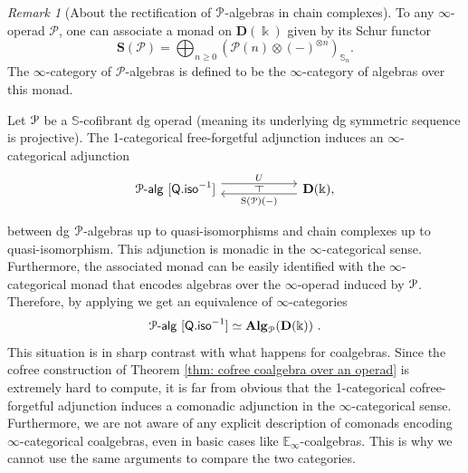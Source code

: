\documentclass{proc-l}
\renewcommand{\mathcal}{\EuScript}
\newcommand{\onepalg}{\mathcal{P}\text{-}\mathsf{alg}}
\theoremstyle{plain}
\theoremstyle{definition}
\theoremstyle{remark}
\newtheorem{remark}[{theorem}]{Remark}
\newcommand{\kk}{\Bbbk}
\begin{document}
\begin{remark}[{About the rectification of $\mathcal{P}$-algebras in chain complexes}]%
\label{Remark:3.3}
To any $\infty$-operad $\mathscr{P}$, one can associate a monad on $\mathbf{D}(\kk)$ given by its Schur functor
\[
\mathbf{S}(\mathscr{P}) = \bigoplus_{n \geq 0} \left(\mathscr{P}(n) \otimes (-)^{\otimes n}\right)_{\mathbb{S}_n}.
\]
The $\infty$-category of $\mathscr{P}$-algebras is defined to be the $\infty$-category of algebras over this monad.

Let $\mathcal{P}$ be a $\mathbb{S}$-cofibrant dg operad (meaning its underlying dg symmetric sequence is projective). The  1-categorical free-forgetful adjunction induces an $\infty$-categorical adjunction
\[
\begin{tikzcd}[column sep=5pc,row sep=3pc]
\onepalg~[\mathsf{Q.iso}^{-1}] \arrow[r, shift left=1.1ex, "U"{name=F}] & \mathbf{D}(\kk), \arrow[l, shift left=.75ex, "\mathrm{S}(\mathcal{P})(-)"{name=U}]
\arrow[phantom, from=F, to=U, , "\dashv" rotate=90]
\end{tikzcd}
\]

between dg $\mathcal{P}$-algebras up to quasi-isomorphisms and chain complexes up to quasi-isomorphism. This adjunction is monadic in the $\infty$-categorical sense. Furthermore, the associated monad can be easily identified with the $\infty$-categorical monad that encodes algebras over the $\infty$-operad induced by $\mathcal{P}$. Therefore, by applying \cite[Theorem 4.7.3.5]{HigherAlgebra} we get an equivalence of $\infty$-categories
\[
\onepalg~[\mathsf{Q.iso}^{-1}] \simeq \mathbf{Alg}_{\mathcal{P}}(\mathbf{D}(\kk))~.
\]
This situation is in sharp contrast with what happens for coalgebras. Since the cofree construction of Theorem \ref{thm: cofree coalgebra over an operad} is extremely hard to compute, it is far from obvious that the 1-categorical cofree-forgetful adjunction induces a comonadic adjunction in the $\infty$-categorical sense. Furthermore, we are not aware of any explicit description of comonads encoding $\infty$-categorical coalgebras, even in basic cases like $\mathbb{E}_\infty$-coalgebras. This is why we cannot use the same arguments to compare the two categories.
\end{remark}
\end{document}
